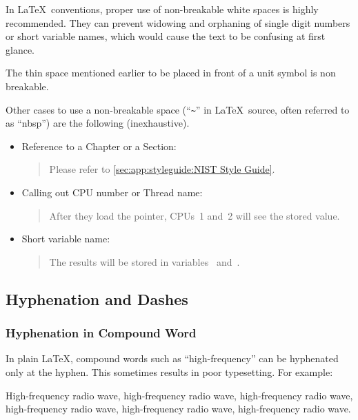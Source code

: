 In \LaTeX\ conventions, proper use of non-breakable white spaces
is highly recommended. They can prevent widowing and orphaning
of single digit numbers or short variable names, which would
cause the text to be confusing at first glance.

The thin space mentioned earlier to be placed in front of a unit
symbol is non breakable.

Other cases to use a non-breakable space (``\verb|~|'' in \LaTeX\
source, often referred to as ``nbsp'')
are the following (inexhaustive).

\begin{itemize}
\item Reference to a Chapter or a Section:
  \begin{quote}
    Please refer to \cref{sec:app:styleguide:NIST Style Guide}.
  \end{quote}
\item Calling out CPU number or Thread name:
  \begin{quote}
    After they load the pointer, CPUs~1 and~2 will see the stored
    value.
  \end{quote}
\item Short variable name:
  \begin{quote}
    The results will be stored in variables~ and~.
  \end{quote}
\end{itemize}

\subsection{Hyphenation and Dashes}
\label{sec:app:styleguide:Hyphenation and Dashes}

\subsubsection{Hyphenation in Compound Word}
\label{sec:app:styleguide:Hyphenation in Compound Word}

In plain \LaTeX, compound words such as ``high-frequency''
can be hyphenated only at the hyphen. This sometimes results
in poor typesetting. For example:

\begin{center}\begin{minipage}{2.6in}\vspace{0.6\baselineskip}
  High-frequency radio wave, high-frequency radio wave,
  high-frequency radio wave, high-frequency radio wave,
  high-frequency radio wave, high-frequency radio wave.
\vspace{0.6\baselineskip}\end{minipage}\end{center}

